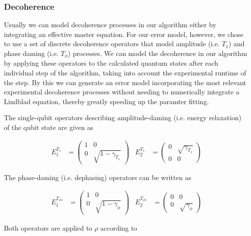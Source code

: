 \subsubsection{Decoherence}

Usually we can model decoherence processes in our algorithm either by integrating an effective master equation. For our error model, however, we chose to use a set of discrete decoherence operators that model amplitude (i.e. $T_1$) and phase daming (i.e. $T_\phi$) processes. We can model the decoherence in our algorithm by applying these operators to the calculated quantum states after each individual step of the algorithm, taking into account the experimental runtime of the step. By this we can generate an error model incorporating the most relevant experimental decoherence processes without needing to numerically integrate a Lindblad equation, thereby greatly speeding up the paramter fitting.

\smallskip

The single-qubit operators describing amplitude-daming (i.e. energy relaxation) of the qubit state are given as \citep{michael_a._nielsen_quantum_2000}

\begin{align}
 E_1^{T_1} & = \left(\begin{array}{cc} 1 & 0 \\ 0 & \sqrt{1-\gamma_{T_1}} \end{array}\right)   &  E_2^{T_1}  & = \left( \begin{array}{cc} 0 & \sqrt{\gamma_{T_1}} \\ 0 & 0 \end{array} \right) \label{eq:grover_energy_relaxation}
\end{align}

The phase-daming (i.e. dephasing) operators can be written as

\begin{align}
 E_1^{T_{\phi 1}} & = \left(\begin{array}{cc} 1 & 0 \\ 0 & \sqrt{1-\gamma_\phi} \end{array}\right)   &  E_2^{T_{\phi 1}}  & = \left( \begin{array}{cc} 0 & 0 \\ 0 & \sqrt{\gamma_\phi}  \end{array} \right) \label{eq:grover_phase_decoherence}
\end{align}

Both operators are applied to $\rho$ according to

